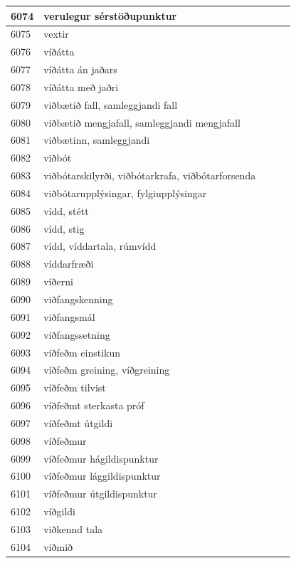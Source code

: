 \begin{longtable}{p{}|p{}|p{}|p{}|p{}}
\hline
6074 & verulegur sérstöðupunktur &  &  &  \\
\hline
6075 & vextir &  &  &  \\
\hline
6076 & víðátta &  &  &  \\
\hline
6077 & víðátta án jaðars &  &  &  \\
\hline
6078 & víðátta með jaðri &  &  &  \\
\hline
6079 & viðbætið fall, samleggjandi fall &  &  &  \\
\hline
6080 & viðbætið mengjafall, samleggjandi mengjafall &  &  &  \\
\hline
6081 & viðbætinn, samleggjandi &  &  &  \\
\hline
6082 & viðbót &  &  &  \\
\hline
6083 & viðbótarskilyrði, viðbótarkrafa, viðbótarforsenda &  &  &  \\
\hline
6084 & viðbótarupplýsingar, fylgiupplýsingar &  &  &  \\
\hline
6085 & vídd, stétt &  &  &  \\
\hline
6086 & vídd, stig &  &  &  \\
\hline
6087 & vídd, víddartala, rúmvídd &  &  &  \\
\hline
6088 & víddarfræði &  &  &  \\
\hline
6089 & víðerni &  &  &  \\
\hline
6090 & viðfangskenning &  &  &  \\
\hline
6091 & viðfangsmál &  &  &  \\
\hline
6092 & viðfangssetning &  &  &  \\
\hline
6093 & víðfeðm einstikun &  &  &  \\
\hline
6094 & víðfeðm greining, víðgreining &  &  &  \\
\hline
6095 & víðfeðm tilvist &  &  &  \\
\hline
6096 & víðfeðmt sterkasta próf &  &  &  \\
\hline
6097 & víðfeðmt útgildi &  &  &  \\
\hline
6098 & víðfeðmur &  &  &  \\
\hline
6099 & víðfeðmur hágildispunktur &  &  &  \\
\hline
6100 & víðfeðmur lággildispunktur &  &  &  \\
\hline
6101 & víðfeðmur útgildispunktur &  &  &  \\
\hline
6102 & víðgildi &  &  &  \\
\hline
6103 & viðkennd tala &  &  &  \\
\hline
6104 & viðmið &  &  &  \\

\end{longtable}
